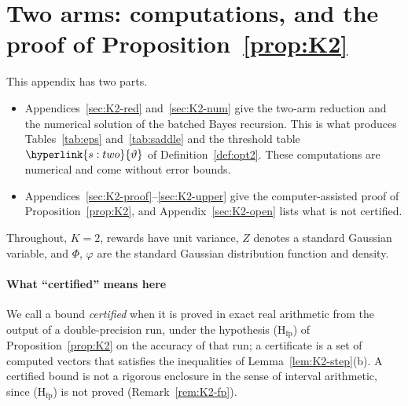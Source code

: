 \documentclass[11pt]{article}
\DeclareRobustCommand{\sy}[2]{{\hyperlink{#1}{#2}}}
\newcommand{\1}{\mathbf{1}}
\newcommand{\thr}{\sy{s:two}{\vartheta}}
\begin{document}
\section{Two arms: computations, and the proof of Proposition~\ref{prop:K2}}\label{sec:app-K2}

\newcommand{\kU}{\sy{k:UI}{U^{\lambda}}}
\newcommand{\kI}{\sy{k:UI}{I^{\lambda}}}
\newcommand{\kF}{\sy{k:UI}{\mathcal G}}
\newcommand{\kg}{\sy{k:g}{g}}
\newcommand{\kR}{\sy{k:rec}{\mathcal R}}
\newcommand{\kB}{\sy{k:rec}{\mathcal B}}
\newcommand{\kPi}{\sy{k:rec}{\Pi}}
\newcommand{\kPri}{\sy{k:prior}{\Pi_{\lambda,d}}}
\newcommand{\kQ}{\sy{k:prior}{\mathbb Q}}
\newcommand{\kP}[1]{\sy{k:prior}{\mathbb P}_{#1}}
\newcommand{\kBb}{\sy{k:prior}{B^\flat}}
\newcommand{\kW}{\sy{k:W}{\Psi}}
\newcommand{\kL}{\sy{k:W}{L_\varepsilon}}
\newcommand{\kT}{\sy{k:W}{T}^{\mathrm{rem}}}
\newcommand{\kchi}{\sy{k:ker}{\chi}}
\newcommand{\kGam}{\sy{k:ker}{\Gamma}}
\newcommand{\kS}{\sy{k:step}{\mathcal S}}
\newcommand{\kdfp}{\sy{k:alg}{\delta_{\mathrm{fp}}}}
\newcommand{\kTC}{\sy{k:tc}{\mathrm{TC}}}
\newcommand{\kH}{\sy{k:tc}{H}}
\newcommand{\kr}{\sy{k:rho}{r_{\mathrm{TC}}}}
\newcommand{\kEm}{\sy{k:rho}{E_-}}
\newcommand{\kPo}{\sy{k:rho}{P_0}}


\medskip
\noindent This appendix has two parts.
\begin{itemize}
\item Appendices~\ref{sec:K2-red} and~\ref{sec:K2-num} give the two-arm reduction and the numerical solution of the batched Bayes recursion. This is what produces
Tables~\ref{tab:eps} and~\ref{tab:saddle} and the threshold table $\thr$ of Definition~\ref{def:opt2}. These computations are numerical and come without
error bounds.
\item Appendices~\ref{sec:K2-proof}--\ref{sec:K2-upper} give the computer-assisted proof of Proposition~\ref{prop:K2}, and Appendix~\ref{sec:K2-open} lists what is
not certified.
\end{itemize}
Throughout, $K=2$, rewards have unit variance, $Z$ denotes a standard Gaussian variable, and $\Phi$, $\varphi$ are the standard Gaussian distribution function and density.

\paragraph{What ``certified'' means here} We call a bound \emph{certified} when it is proved in exact real arithmetic from the output of a double-precision
run, under the hypothesis (H$_{\mathrm{fp}}$) of Proposition~\ref{prop:K2} on the accuracy of that run; a certificate is a set of computed vectors that
satisfies the inequalities of Lemma~\ref{lem:K2-step}(b). A certified bound is not a rigorous enclosure in the sense of interval arithmetic, since
(H$_{\mathrm{fp}}$) is not proved (Remark~\ref{rem:K2-fp}).
\end{document}
